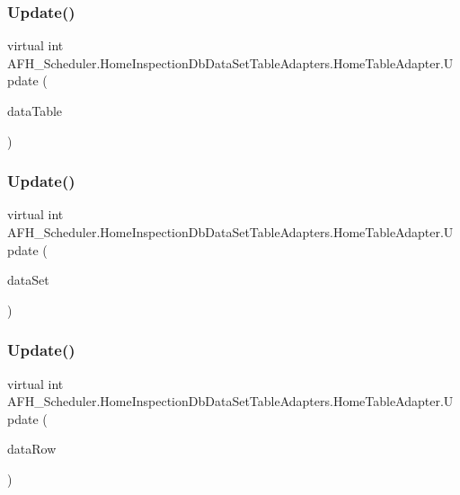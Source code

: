 \subsubsection{Update()\hspace{0.1cm}{\footnotesize\ttfamily [1/6]}}
{\footnotesize\ttfamily virtual int A\+F\+H\+\_\+\+Scheduler.\+Home\+Inspection\+Db\+Data\+Set\+Table\+Adapters.\+Home\+Table\+Adapter.\+Update (\begin{DoxyParamCaption}\item[{\textbf{ Home\+Inspection\+Db\+Data\+Set.\+Home\+Data\+Table}}]{data\+Table }\end{DoxyParamCaption})\hspace{0.3cm}{\ttfamily [virtual]}}

\mbox{\label{class_a_f_h___scheduler_1_1_home_inspection_db_data_set_table_adapters_1_1_home_table_adapter_a8d948293b463d5fb1c3f8ff499b55db7}} 
\subsubsection{Update()\hspace{0.1cm}{\footnotesize\ttfamily [2/6]}}
{\footnotesize\ttfamily virtual int A\+F\+H\+\_\+\+Scheduler.\+Home\+Inspection\+Db\+Data\+Set\+Table\+Adapters.\+Home\+Table\+Adapter.\+Update (\begin{DoxyParamCaption}\item[{\textbf{ Home\+Inspection\+Db\+Data\+Set}}]{data\+Set }\end{DoxyParamCaption})\hspace{0.3cm}{\ttfamily [virtual]}}

\mbox{\label{class_a_f_h___scheduler_1_1_home_inspection_db_data_set_table_adapters_1_1_home_table_adapter_aa6a788027c99f3313971c2a0b2c0b63c}} 
\subsubsection{Update()\hspace{0.1cm}{\footnotesize\ttfamily [3/6]}}
{\footnotesize\ttfamily virtual int A\+F\+H\+\_\+\+Scheduler.\+Home\+Inspection\+Db\+Data\+Set\+Table\+Adapters.\+Home\+Table\+Adapter.\+Update (\begin{DoxyParamCaption}\item[{global\+::\+System.\+Data.\+Data\+Row}]{data\+Row }\end{DoxyParamCaption})\hspace{0.3cm}{\ttfamily [virtual]}}

